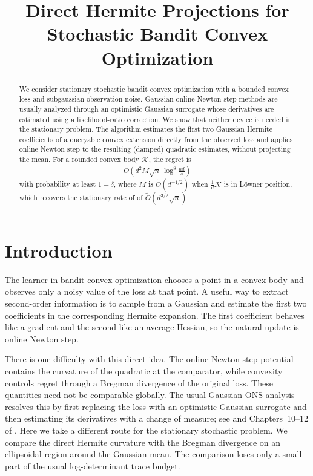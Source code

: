 \documentclass[11pt]{article}
\title{Direct Hermite Projections for Stochastic Bandit Convex Optimization}
\author{\qquad}
\date{}
\newcommand{\K}{\mathcal K}
\newcommand{\1}{\mathbf 1}
\begin{document}
\maketitle

\begin{abstract}
    We consider stationary stochastic bandit convex optimization with a bounded
    convex loss and subgaussian observation noise.  Gaussian online Newton step
    methods are usually analyzed through an optimistic Gaussian surrogate whose
    derivatives are estimated using a likelihood-ratio correction.  We show that
    neither device is needed in the stationary problem.  The algorithm estimates
    the first two Gaussian Hermite coefficients of a queryable convex extension
    directly from the observed loss and applies online Newton step to the resulting
    (damped) quadratic estimates, without projecting the mean.
    For a rounded convex body $\K$, the regret is
    \begin{align}
        O\!\left(d^2 M\sqrt n\,
        \log^8\!\frac{nd}{\delta}\right)
    \end{align}
    with probability at least $1-\delta$, where $M$ is $\tilde{O}(d^{-1/2})$
    when $\frac1d \K$ is in L\"owner position,
    which recovers the stationary rate of \citet{lattimore2023second}
    of $\widetilde O(d^{3/2}\sqrt n)$.
\end{abstract}

\section{Introduction}

The learner in bandit convex optimization chooses a point in a convex body
and observes only a noisy value of the loss at that point.  A useful way to
extract second-order information is to sample from a Gaussian and estimate the
first two coefficients in the corresponding Hermite expansion.  The first
coefficient behaves like a gradient and the second like an average Hessian, so
the natural update is online Newton step.

There is one difficulty with this direct idea.  The online Newton step
potential contains the curvature of the quadratic at the comparator, while
convexity controls regret through a Bregman divergence of the original loss.
These quantities need not be comparable globally.  The usual Gaussian ONS
analysis resolves this by first replacing the loss with an optimistic
Gaussian surrogate and then estimating its derivatives with a change of
measure; see \citet{lattimore2023second} and Chapters~10--12 of
\citet{lattimore2026bandit}.  Here we take a
different route for the stationary stochastic problem.  We compare the direct
Hermite curvature with the Bregman divergence on an ellipsoidal region around
the Gaussian mean.  The comparison loses only a small part of the usual
log-determinant trace budget.
\end{document}
